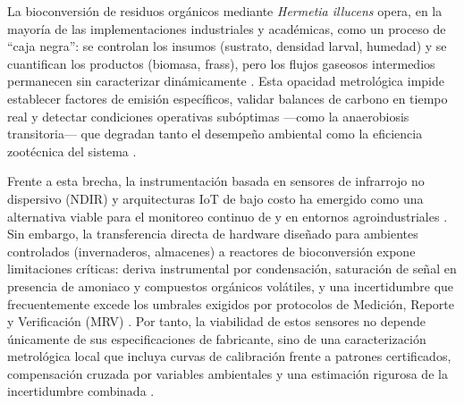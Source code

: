 
La bioconversión de residuos orgánicos mediante \textit{Hermetia illucens} opera, en la mayoría de las implementaciones industriales y académicas, como un proceso de ``caja negra'': se controlan los insumos (sustrato, densidad larval, humedad) y se cuantifican los productos (biomasa, frass), pero los flujos gaseosos intermedios permanecen sin caracterizar dinámicamente \parencite{jenkinsProcessingPoultryManure2025, fuhrmannComprehensiveIndustryrelevantBlack2025a}. Esta opacidad metrológica impide establecer factores de emisión específicos, validar balances de carbono en tiempo real y detectar condiciones operativas subóptimas ---como la anaerobiosis transitoria--- que degradan tanto el desempeño ambiental como la eficiencia zootécnica del sistema \parencite{bekkerImpactSubstrateMoisture2021a, rossiEstimatingDynamicsGreenhouse2024a}.

Frente a esta brecha, la instrumentación basada en sensores de infrarrojo no dispersivo (NDIR) y arquitecturas IoT de bajo costo ha emergido como una alternativa viable para el monitoreo continuo de  y  en entornos agroindustriales \parencite{rajRealTimeEstimation2023a, duobieneDevelopmentWirelessSensor2022, yavariArtEMonArtificialIntelligence2023}. Sin embargo, la transferencia directa de hardware diseñado para ambientes controlados (invernaderos, almacenes) a reactores de bioconversión expone limitaciones críticas: deriva instrumental por condensación, saturación de señal en presencia de amoniaco y compuestos orgánicos volátiles, y una incertidumbre que frecuentemente excede los umbrales exigidos por protocolos de Medición, Reporte y Verificación (MRV) \parencite{AgricultureClimateChangea, herrinCollateralDataQualitya}. Por tanto, la viabilidad de estos sensores no depende únicamente de sus especificaciones de fabricante, sino de una caracterización metrológica local que incluya curvas de calibración frente a patrones certificados, compensación cruzada por variables ambientales y una estimación rigurosa de la incertidumbre combinada \parencite{vanIntegrationInternetofThingsSustainable2022a}.

